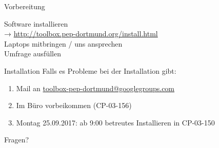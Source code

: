 \begin{frame}{Vorbereitung}
  \begin{center}
    \huge
    Software installieren\\[0.5\baselineskip]
    → \textcolor{blue!70!black}{\url{http://toolbox.pep-dortmund.org/install.html}}\\[0.5\baselineskip]
    Laptops mitbringen / uns ansprechen\\[0.5\baselineskip]
    Umfrage ausfüllen
  \end{center}
\end{frame}
\begin{frame}{Installation}
  \huge
  Falls es Probleme bei der Installation gibt:\\[0.5\baselineskip]
  \begin{enumerate}
    \item Mail an \href{mailto:toolbox-pep-dortmund@googlegroups.com}{toolbox-pep-dortmund@googlegroups.com}
    \item Im Büro vorbeikommen (CP-03-156)
    \item Montag 25.09.2017: ab 9:00 betreutes Installieren in CP-03-150
  \end{enumerate}
\end{frame}
\begin{frame}
  \Huge\centering
  \textcolor{red!70!black}{Fragen?}
\end{frame}

